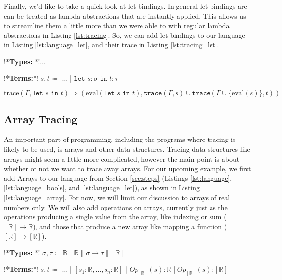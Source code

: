         Finally, we'd like to take a quick look at let-bindings.
        In general let-bindings are can be treated as lambda abstractions that are instantly applied.
        This allows us to streamline them a little more than we were able to with regular lambda abstractions in Listing \ref{lst:tracing}.
        So, we can add let-bindings to our language in Listing \ref{lst:language_let}, and their trace in Listing \ref{lst:tracing_let}.

        \begin{quicklst}[caption=Adding let bindings, label=lst:language_let, gobble=12]
            !*\textbf{Types: }*!$\dots$

            !*\textbf{Terms:}*!
                $s,t\coloneqq$
                    $\dots$
                  | $\texttt{let }s:\sigma\texttt{ in }t:\tau$
        \end{quicklst}

        \begin{quicklst}[caption=Tracing let bindings, label=lst:tracing_let, gobble=12]
            $\text{trace}(\Gamma,\texttt{let }s\texttt{ in }t)\Rightarrow(\text{eval}(\texttt{let }s\texttt{ in }t),\texttt{trace}(\Gamma,s)\cup\texttt{trace}(\Gamma\cup\{\text{eval}(s)\},t))$
        \end{quicklst}

    \subsection{Array Tracing}
        An important part of programming, including the programs where tracing is likely to be used, is arrays and other data structures.
        Tracing data structures like arrays might seem a little more complicated, however the main point is about whether or not we want to trace away arrays.
        For our upcoming example, we first add Arrays to our language from Section \ref{sec:steps} (Listings \ref{lst:language}, \ref{lst:language_bools}, and \ref{lst:language_let}), as shown in Listing \ref{lst:language_array}.
        For now, we will limit our discussion to arrays of real numbers only.
        We will also add operations on arrays, currently just as the operations producing a single value from the array, like indexing or sum ($[\mathbb{R}]\to\mathbb{R}$), and those that produce a new array like mapping a function ($[\mathbb{R}]\to[\mathbb{R}]$).

        \begin{quicklst}[caption=Adding arrays, label=lst:language_array, gobble=12]
            !*\textbf{Types: }*!
                $\sigma,\tau\coloneqq\mathbb{B}\|\mathbb{R}\|\sigma\to\tau\|[\mathbb{R}]$

            !*\textbf{Terms:}*!
                $s,t\coloneqq$
                    $\dots$
                  | $[s_1:\mathbb{R},\dots,s_n:\mathbb{R}]$
                  | $Op_{[\mathbb{R}]}(s):\mathbb{R}$
                  | $Op_{[\mathbb{R}]}(s):[\mathbb{R}]$
        \end{quicklst}
        
